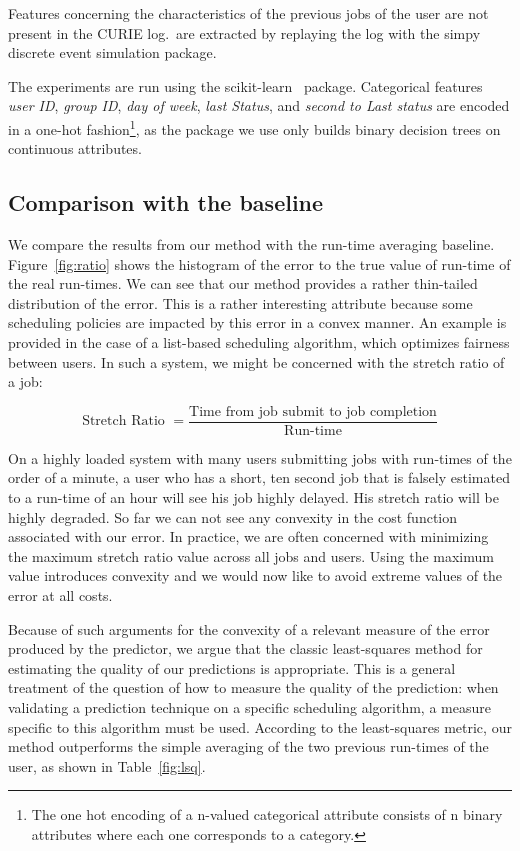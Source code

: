 \documentclass{article}
\begin{document}
Features concerning the characteristics of the previous jobs of the user are not present in the CURIE log.\ are extracted by replaying the log with the simpy~\cite{simpy} discrete event simulation package.

The experiments are run using the scikit-learn~\cite{scikit-learn} package. Categorical features \textit{user ID}, \textit{group ID}, \textit{day of week}, \textit{last Status}, and \textit{second to Last status} are encoded in a one-hot fashion\footnote{The one hot encoding of a n-valued categorical attribute consists of n binary attributes where each one corresponds to a category.}, as the package we use only builds binary decision trees on continuous attributes.

\subsection{Comparison with the baseline}
\label{sub:comparison_with_average_baseline}
We compare the results from our method with the run-time averaging baseline.
Figure~\ref{fig:ratio} shows the histogram of the error to the true value of run-time of the real run-times.
We can see that our method provides a rather thin-tailed distribution of the error.
This is a rather interesting attribute because some scheduling policies are impacted by this error in a convex manner.
An example is provided in the case of a list-based scheduling algorithm, which optimizes fairness between users. In such a system, we might be concerned with the stretch ratio of a job:

\[
\mbox{Stretch Ratio } = \frac{\mbox{Time from job submit to job completion}}{\mbox{Run-time}}
\]

On a highly loaded system with many users submitting jobs with run-times of the order of a minute, a user who has a short, ten second job that is falsely estimated to a run-time of an hour will see his job highly delayed. His stretch ratio will be highly degraded.
So far we can not see any convexity in the cost function associated with our error. In practice, we are often concerned with minimizing the maximum stretch ratio value across all jobs and users. Using the maximum value introduces convexity and we would now like to avoid extreme values of the error at all costs.

Because of such arguments for the convexity of a relevant measure of the error produced by the predictor, we argue that the classic least-squares method for estimating the quality of our predictions is appropriate. This is a general treatment of the question of how to measure the quality of the prediction: when validating a prediction technique on a specific scheduling algorithm, a measure specific to this algorithm must be used.
According to the least-squares metric, our method outperforms the simple averaging of the two previous run-times of the user, as shown in Table~\ref{fig:lsq}.
\end{document}
